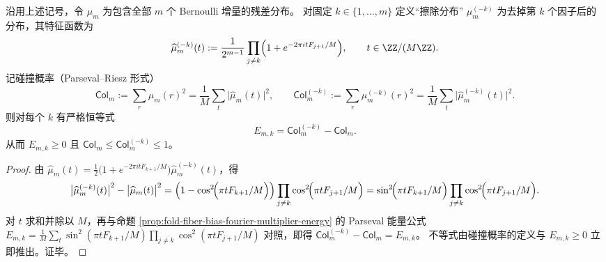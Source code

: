 \begin{theorem}[擦除因子后的碰撞概率增量等于条件偏置能量]\label{thm:fold-fiber-bias-energy-erasure-identity}
沿用上述记号，令 \(\mu_m\) 为包含全部 \(m\) 个 Bernoulli 增量的残差分布。
对固定 \(k\in\{1,\dots,m\}\) 定义“擦除分布” \(\mu_m^{(-k)}\) 为去掉第 \(k\) 个因子后的分布，其特征函数为
\[
\widehat\mu_m^{(-k)}(t)
:=\frac{1}{2^{m-1}}\prod_{j\ne k}\Bigl(1+e^{-2\pi i tF_{j+1}/M}\Bigr),
\qquad t\in\ZZ/(M\ZZ).
\]
记碰撞概率（Parseval--Riesz 形式）
\[
\mathsf{Col}_m:=\sum_{r}\mu_m(r)^2=\frac1M\sum_{t}\bigl|\widehat\mu_m(t)\bigr|^2,
\qquad
\mathsf{Col}_m^{(-k)}:=\sum_{r}\mu_m^{(-k)}(r)^2=\frac1M\sum_{t}\bigl|\widehat\mu_m^{(-k)}(t)\bigr|^2.
\]
则对每个 \(k\) 有严格恒等式
\[
\boxed{\;E_{m,k}=\mathsf{Col}_m^{(-k)}-\mathsf{Col}_m.\;}
\]
从而 \(E_{m,k}\ge 0\) 且 \(\mathsf{Col}_m\le \mathsf{Col}_m^{(-k)}\le 1\)。
\end{theorem}
\begin{proof}
由 \(\widehat\mu_m(t)=\frac{1}{2}\bigl(1+e^{-2\pi i tF_{k+1}/M}\bigr)\widehat\mu_m^{(-k)}(t)\)，得
\[
\bigl|\widehat\mu_m^{(-k)}(t)\bigr|^2-\bigl|\widehat\mu_m(t)\bigr|^2
=\left(1-\cos^2\!\Bigl(\pi tF_{k+1}/M\Bigr)\right)\prod_{j\ne k}\cos^2\!\Bigl(\pi tF_{j+1}/M\Bigr)
=\sin^2\!\Bigl(\pi tF_{k+1}/M\Bigr)\prod_{j\ne k}\cos^2\!\Bigl(\pi tF_{j+1}/M\Bigr).
\]
对 \(t\) 求和并除以 \(M\)，再与命题 \ref{prop:fold-fiber-bias-fourier-multiplier-energy} 的 Parseval 能量公式
\(
E_{m,k}=\frac1M\sum_t\sin^2(\pi tF_{k+1}/M)\prod_{j\ne k}\cos^2(\pi tF_{j+1}/M)
\)
对照，即得 \(\mathsf{Col}_m^{(-k)}-\mathsf{Col}_m=E_{m,k}\)。
不等式由碰撞概率的定义与 \(E_{m,k}\ge 0\) 立即推出。证毕。
\end{proof}

